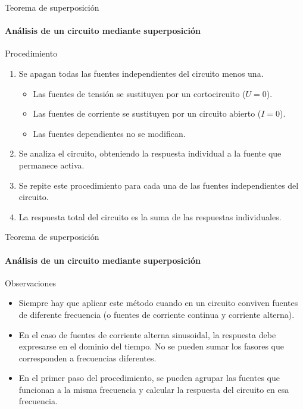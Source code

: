 \documentclass[aspectratio=169, usenames,svgnames,dvipsnames]{beamer}
\begin{document}
\begin{frame}[label={sec:org6a5142a}]{Teorema de superposición}
\framesubtitle{Análisis de un circuito mediante superposición}
\begin{block}{Procedimiento}
\begin{enumerate}
\item Se apagan todas las fuentes \alert{independientes} del circuito menos una.
\begin{itemize}
\item Las fuentes de tensión se sustituyen por un cortocircuito (\(U = 0\)).
\item Las fuentes de corriente se sustituyen por un circuito abierto (\(I = 0\)).
\item Las fuentes \alert{dependientes} \alert{no} se modifican.
\end{itemize}
\item Se analiza el circuito, obteniendo la respuesta individual a la fuente que permanece activa.
\item Se repite este procedimiento para cada una de las fuentes \alert{independientes} del circuito.
\item La respuesta total del circuito es la suma de las respuestas individuales.
\end{enumerate}
\end{block}
\end{frame}

\begin{frame}[label={sec:orga5f37d4}]{Teorema de superposición}
\framesubtitle{Análisis de un circuito mediante superposición}

\begin{block}{Observaciones}
\begin{itemize}
\item \alert{Siempre} hay que aplicar este método cuando en un circuito conviven fuentes de \alert{diferente frecuencia} (o fuentes de corriente continua y corriente alterna).
\item En el caso de fuentes de corriente alterna \alert{sinusoidal}, la respuesta debe expresarse en el \alert{dominio del tiempo}. \alert{No} se pueden \alert{sumar} los \alert{fasores} que corresponden a \alert{frecuencias diferentes}.
\item En el primer paso del procedimiento, se pueden agrupar las fuentes que funcionan a la misma frecuencia y calcular la respuesta del circuito en esa frecuencia.
\end{itemize}
\end{block}
\end{frame}
\end{document}
